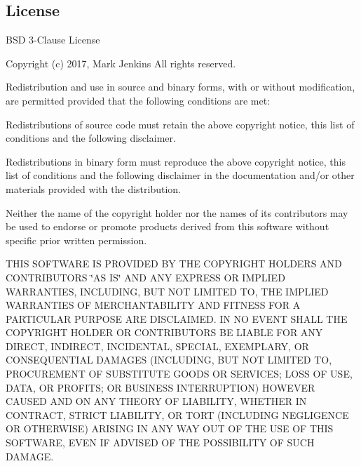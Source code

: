 \subsection*{License}

B\-S\-D 3-\/\-Clause License

Copyright (c) 2017, Mark Jenkins All rights reserved.

Redistribution and use in source and binary forms, with or without modification, are permitted provided that the following conditions are met\-:


\begin{DoxyItemize}
\item Redistributions of source code must retain the above copyright notice, this list of conditions and the following disclaimer.
\item Redistributions in binary form must reproduce the above copyright notice, this list of conditions and the following disclaimer in the documentation and/or other materials provided with the distribution.
\item Neither the name of the copyright holder nor the names of its contributors may be used to endorse or promote products derived from this software without specific prior written permission.
\end{DoxyItemize}

T\-H\-I\-S S\-O\-F\-T\-W\-A\-R\-E I\-S P\-R\-O\-V\-I\-D\-E\-D B\-Y T\-H\-E C\-O\-P\-Y\-R\-I\-G\-H\-T H\-O\-L\-D\-E\-R\-S A\-N\-D C\-O\-N\-T\-R\-I\-B\-U\-T\-O\-R\-S \char`\"{}\-A\-S I\-S\char`\"{} A\-N\-D A\-N\-Y E\-X\-P\-R\-E\-S\-S O\-R I\-M\-P\-L\-I\-E\-D W\-A\-R\-R\-A\-N\-T\-I\-E\-S, I\-N\-C\-L\-U\-D\-I\-N\-G, B\-U\-T N\-O\-T L\-I\-M\-I\-T\-E\-D T\-O, T\-H\-E I\-M\-P\-L\-I\-E\-D W\-A\-R\-R\-A\-N\-T\-I\-E\-S O\-F M\-E\-R\-C\-H\-A\-N\-T\-A\-B\-I\-L\-I\-T\-Y A\-N\-D F\-I\-T\-N\-E\-S\-S F\-O\-R A P\-A\-R\-T\-I\-C\-U\-L\-A\-R P\-U\-R\-P\-O\-S\-E A\-R\-E D\-I\-S\-C\-L\-A\-I\-M\-E\-D. I\-N N\-O E\-V\-E\-N\-T S\-H\-A\-L\-L T\-H\-E C\-O\-P\-Y\-R\-I\-G\-H\-T H\-O\-L\-D\-E\-R O\-R C\-O\-N\-T\-R\-I\-B\-U\-T\-O\-R\-S B\-E L\-I\-A\-B\-L\-E F\-O\-R A\-N\-Y D\-I\-R\-E\-C\-T, I\-N\-D\-I\-R\-E\-C\-T, I\-N\-C\-I\-D\-E\-N\-T\-A\-L, S\-P\-E\-C\-I\-A\-L, E\-X\-E\-M\-P\-L\-A\-R\-Y, O\-R C\-O\-N\-S\-E\-Q\-U\-E\-N\-T\-I\-A\-L D\-A\-M\-A\-G\-E\-S (I\-N\-C\-L\-U\-D\-I\-N\-G, B\-U\-T N\-O\-T L\-I\-M\-I\-T\-E\-D T\-O, P\-R\-O\-C\-U\-R\-E\-M\-E\-N\-T O\-F S\-U\-B\-S\-T\-I\-T\-U\-T\-E G\-O\-O\-D\-S O\-R S\-E\-R\-V\-I\-C\-E\-S; L\-O\-S\-S O\-F U\-S\-E, D\-A\-T\-A, O\-R P\-R\-O\-F\-I\-T\-S; O\-R B\-U\-S\-I\-N\-E\-S\-S I\-N\-T\-E\-R\-R\-U\-P\-T\-I\-O\-N) H\-O\-W\-E\-V\-E\-R C\-A\-U\-S\-E\-D A\-N\-D O\-N A\-N\-Y T\-H\-E\-O\-R\-Y O\-F L\-I\-A\-B\-I\-L\-I\-T\-Y, W\-H\-E\-T\-H\-E\-R I\-N C\-O\-N\-T\-R\-A\-C\-T, S\-T\-R\-I\-C\-T L\-I\-A\-B\-I\-L\-I\-T\-Y, O\-R T\-O\-R\-T (I\-N\-C\-L\-U\-D\-I\-N\-G N\-E\-G\-L\-I\-G\-E\-N\-C\-E O\-R O\-T\-H\-E\-R\-W\-I\-S\-E) A\-R\-I\-S\-I\-N\-G I\-N A\-N\-Y W\-A\-Y O\-U\-T O\-F T\-H\-E U\-S\-E O\-F T\-H\-I\-S S\-O\-F\-T\-W\-A\-R\-E, E\-V\-E\-N I\-F A\-D\-V\-I\-S\-E\-D O\-F T\-H\-E P\-O\-S\-S\-I\-B\-I\-L\-I\-T\-Y O\-F S\-U\-C\-H D\-A\-M\-A\-G\-E.


